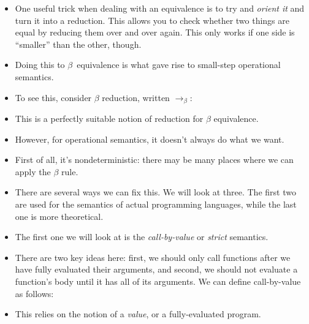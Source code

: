 \documentclass{lecturenotes}
\newcommand{\abs}[2]{\ensuremath{\lambda #1.\,#2}}
\newcommand{\app}[2]{\ensuremath{#1\;#2}}
\begin{document}
\begin{itemize}
\item One useful trick when dealing with an equivalence is to try and \emph{orient it} and turn it into a reduction.
  This allows you to check whether two things are equal by reducing them over and over again.
  This only works if one side is ``smaller'' than the other, though.
\item Doing this to $\beta$~equivalence is what gave rise to small-step operational semantics.
\item To see this, consider $\beta$ reduction, written $\to_\beta$:
\item This is a perfectly suitable notion of reduction for $\beta$ equivalence.
\item However, for operational semantics, it doesn't always do what we want.
\item First of all, it's nondeterministic: there may be many places where we can apply the $\beta$ rule.
\item There are several ways we can fix this.
  We will look at three.
  The first two are used for the semantics of actual programming languages, while the last one is more theoretical.
\item The first one we will look at is the \emph{call-by-value} or \emph{strict} semantics.
\item There are two key ideas here: first, we should only call functions after we have fully evaluated their arguments, and second, we should not evaluate a function's body until it has all of its arguments.
  We can define call-by-value as follows:
\item This relies on the notion of a \emph{value}, or a fully-evaluated program.

\end{itemize}
\end{document}
